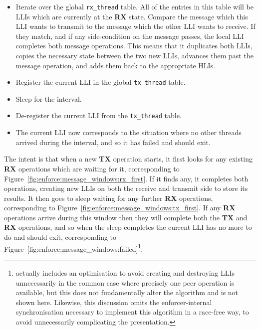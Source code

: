 \begin{itemize}
\item[1] Iterate over the global \texttt{rx\_thread} table.  All of
  the entries in this table will be LLIs which are currently at the
  \textbf{RX} state.  Compare the message which this LLI wants to
  transmit to the message which the other LLI wants to receive.  If
  they match, and if any side-condition on the message passes, the
  local LLI completes both message operations.  This means that it
  duplicates both LLIs, copies the necessary state between the two new
  LLIs, advances them past the message operation, and adds them back
  to the appropriate HLIs.
\item[2] Register the current LLI in the global \texttt{tx\_thread}
  table.
\item[3] Sleep for the interval.
\item[4] De-register the current LLI from the \texttt{tx\_thread}
  table.
\item[5] The current LLI now corresponds to the situation where no
  other threads arrived during the interval, and so it has failed and
  should exit.
\end{itemize}

The intent is that when a new \textbf{TX} operation starts, it first
looks for any existing \textbf{RX} operations which are waiting for
it, corresponding to
Figure~\ref{fig:enforce:message_windows:rx_first}.  If it finds any,
it completes both operations, creating new LLIs on both the receive
and transmit side to store its results.  It then goes to sleep waiting
for any further \textbf{RX} operations, corresponding to
Figure~\ref{fig:enforce:message_windows:tx_first}.  If any \textbf{RX}
operations arrive during this window then they will complete both the
\textbf{TX} and \textbf{RX} operations, and so when the sleep
completes the current LLI has no more to do and should exit,
corresponding to
Figure~\ref{fig:enforce:message_windows:failed}\footnote{{\Implementation}
  actually includes an optimisation to avoid creating and destroying
  LLIs unnecessarily in the common case where precisely one peer
  operation is available, but this does not fundamentally alter the
  algorithm and is not shown here.  Likewise, this discussion omits
  the enforcer-internal synchronisation necessary to implement this
  algorithm in a race-free way, to avoid unnecessarily complicating
  the presentation.}.

